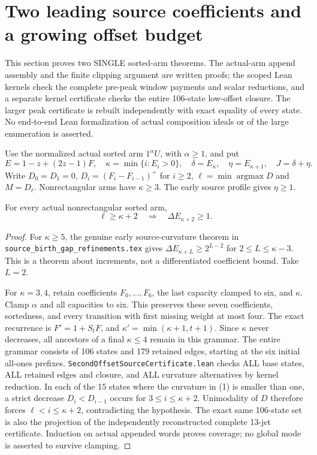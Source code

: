 \section{Two leading source coefficients and a growing offset budget}
This section proves two SINGLE sorted-arm theorems. The actual-arm append
assembly and the finite clipping argument are written proofs; the scoped
Lean kernels check the complete pre-peak window payments and scalar
reductions, and a separate kernel certificate checks the entire 106-state
low-offset closure. The larger peak certificate is rebuilt independently
with exact equality of every state. No end-to-end Lean formalization of
actual composition ideals or of the large enumeration is asserted.

Use the normalized actual sorted arm $1^\alpha U$, with $\alpha\ge1$,
and put
\[
 E=1-z+(2z-1)F,\quad \kappa=\min\{i:E_i>0\},\quad
 \delta=E_\kappa,\quad\eta=E_{\kappa+1},\quad J=\delta+\eta.
\]
Write $D_0=D_1=0$, $D_i=(F_i-F_{i-1})^+$ for $i\ge2$,
$\ell=\min\operatorname{argmax}D$ and $M=D_\ell$. Nonrectangular
arms have $\kappa\ge3$. The early source profile gives $\eta\ge1$.

\begin{lemma}
For every actual nonrectangular sorted arm,
\[
            \ell\ge\kappa+2\quad\Longrightarrow\quad
                    \Delta E_{\kappa+2}\ge1.                 \tag{1}
\]
\end{lemma}
\begin{proof}
For $\kappa\ge5$, the genuine early source-curvature theorem in
\texttt{source\_birth\_gap\_refinements.tex} gives
$\Delta E_{\kappa+L}\ge2^{L-2}$ for $2\le L\le\kappa-3$.
This is a theorem about increments, not a differentiated coefficient bound.
Take $L=2$.

For $\kappa=3,4$, retain coefficients $F_0,\ldots,F_6$, the last
capacity clamped to six, and $\kappa$. Clamp $\alpha$ and all capacities
to six. This preserves these seven coefficients, sortedness, and every
transition with first missing weight at most four. The exact recurrence is
$F'=1+S_tF$, and $\kappa'=\min(\kappa+1,t+1)$.
Since $\kappa$ never decreases, all ancestors of a final $\kappa\le4$
remain in this grammar. The entire grammar consists of 106 states and
179 retained edges, starting at the six initial all-ones prefixes.
\texttt{SecondOffsetSourceCertificate.lean} checks ALL base states,
ALL retained edges and closure, and ALL curvature alternatives by
kernel reduction. In each of the 15 states where the curvature in (1)
is smaller than one, a strict decrease $D_i<D_{i-1}$ occurs for
$3\le i\le\kappa+2$. Unimodality of $D$ therefore forces
$\ell<i\le\kappa+2$, contradicting the hypothesis. The exact same
106-state set is also the projection of the independently reconstructed
complete 13-jet certificate. Induction on actual appended words proves
coverage; no global mode is asserted to survive clamping.
\end{proof}

